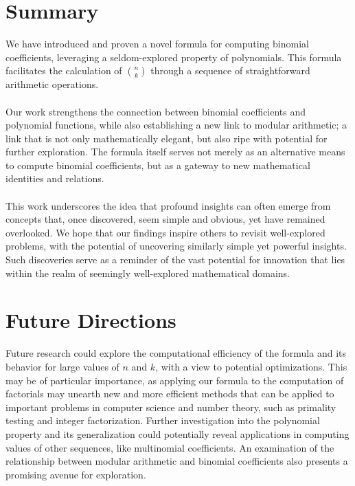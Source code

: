\documentclass{article}
\theoremstyle{plain}
\begin{document}
\section{Summary}
We have introduced and proven a novel formula for computing binomial coefficients, leveraging a seldom-explored property of polynomials. This formula facilitates the calculation of \(\binom{n}{k}\) through a sequence of straightforward arithmetic operations.
\\
\\
Our work strengthens the connection between binomial coefficients and polynomial functions, while also establishing a new link to modular arithmetic; a link that is not only mathematically elegant, but also ripe with potential for further exploration. The formula itself serves not merely as an alternative means to compute binomial coefficients, but as a gateway to new mathematical identities and relations.
\\
\\
This work underscores the idea that profound insights can often emerge from concepts that, once discovered, seem simple and obvious, yet have remained overlooked. We hope that our findings inspire others to revisit well-explored problems, with the potential of uncovering similarly simple yet powerful insights. Such discoveries serve as a reminder of the vast potential for innovation that lies within the realm of seemingly well-explored mathematical domains.

\section{Future Directions}
Future research could explore the computational efficiency of the formula and its behavior for large values of \(n\) and \(k\), with a view to potential optimizations. This may be of particular importance, as applying our formula to the computation of factorials may unearth new and more efficient methods that can be applied to important problems in computer science and number theory, such as primality testing and integer factorization. Further investigation into the polynomial property and its generalization could potentially reveal applications in computing values of other sequences, like multinomial coefficients. An examination of the relationship between modular arithmetic and binomial coefficients also presents a promising avenue for exploration.



\end{document}
